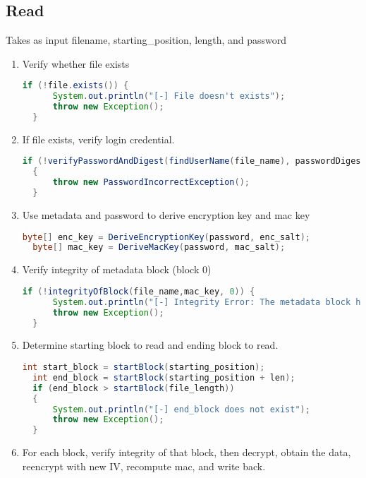\documentclass[a4paper,10pt]{article}
\begin{document}
\subsection{Read} %
\label{sub:read}
Takes as input filename, starting\_position, length, and password
\begin{enumerate}
  \item Verify whether file exists
  \begin{lstlisting}[linewidth=.5\columnwidth,breaklines=true,language=Java]
  if (!file.exists()) {
      System.out.println("[-] File doesn't exists");
      throw new Exception();
  }\end{lstlisting}
  \item If file exists, verify login credential.
  \begin{lstlisting}[linewidth=\columnwidth,breaklines=true,language=Java]
  if (!verifyPasswordAndDigest(findUserName(file_name), passwordDigest, passwd_salt, password))
  {
      throw new PasswordIncorrectException();    
  }\end{lstlisting}
  \item Use metadata and password to derive encryption key and mac key
  \begin{lstlisting}[linewidth=.5\columnwidth,breaklines=true,language=Java]
  byte[] enc_key = DeriveEncryptionKey(password, enc_salt);
  byte[] mac_key = DeriveMacKey(password, mac_salt);\end{lstlisting}
  \item Verify integrity of metadata block (block 0)
  \begin{lstlisting}[linewidth=\columnwidth,breaklines=true,language=Java]
  if (!integrityOfBlock(file_name,mac_key, 0)) {
      System.out.println("[-] Integrity Error: The metadata block has been modified");
      throw new Exception();
  }\end{lstlisting}
  \item Determine starting block to read and ending block to read.
  \begin{lstlisting}[linewidth=\columnwidth,breaklines=true,language=Java]
  int start_block = startBlock(starting_position);
  int end_block = startBlock(starting_position + len);
  if (end_block > startBlock(file_length)) 
  {
      System.out.println("[-] end_block does not exist");
      throw new Exception();    
  }\end{lstlisting}
  \item For each block, verify integrity of that block, then decrypt, obtain the data, reencrypt with new IV, recompute mac, and write back.

\end{enumerate}
\end{document}
